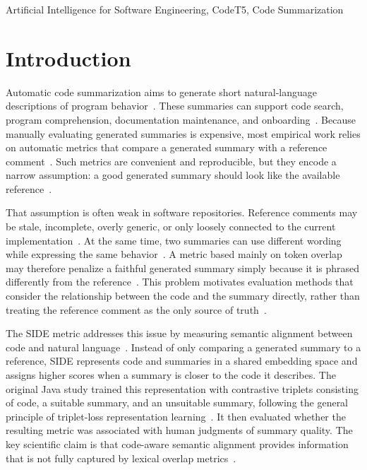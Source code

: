 \documentclass[conference]{IEEEtran}
\begin{document}
\begin{IEEEkeywords}
Artificial Intelligence for Software Engineering, CodeT5, Code Summarization
\end{IEEEkeywords}

\section{Introduction}

Automatic code summarization aims to generate short natural-language descriptions of program behavior~\cite{haiduc2010use,sridhara2010towards,mcburney2014automatic,allamanis2016convolutional,iyer2016summarizing,leclair2019neural}. These summaries can support code search, program comprehension, documentation maintenance, and onboarding~\cite{husain2019codesearchnet,lu2021codexglue}. Because manually evaluating generated summaries is expensive, most empirical work relies on automatic metrics that compare a generated summary with a reference comment~\cite{roy2021reassessing,shi2022evaluation,mastropaolo2024evaluating}. Such metrics are convenient and reproducible, but they encode a narrow assumption: a good generated summary should look like the available reference~\cite{papineni2002bleu,lin2004rouge,banerjee2005meteor,popovic2015chrf,zhang2019bertscore}.

That assumption is often weak in software repositories. Reference comments may be stale, incomplete, overly generic, or only loosely connected to the current implementation~\cite{roy2021reassessing,shi2022evaluation,mastropaolo2024evaluating}. At the same time, two summaries can use different wording while expressing the same behavior~\cite{zhang2019bertscore,ren2020codebleu,eghbali2022crystalbleu}. A metric based mainly on token overlap may therefore penalize a faithful generated summary simply because it is phrased differently from the reference~\cite{papineni2002bleu,lin2004rouge,banerjee2005meteor}. This problem motivates evaluation methods that consider the relationship between the code and the summary directly, rather than treating the reference comment as the only source of truth~\cite{mastropaolo2024evaluating}.

The SIDE metric addresses this issue by measuring semantic alignment between code and natural language~\cite{mastropaolo2024evaluating}. Instead of only comparing a generated summary to a reference, SIDE represents code and summaries in a shared embedding space and assigns higher scores when a summary is closer to the code it describes. The original Java study trained this representation with contrastive triplets consisting of code, a suitable summary, and an unsuitable summary, following the general principle of triplet-loss representation learning~\cite{schroff2015facenet,song2020mpnet}. It then evaluated whether the resulting metric was associated with human judgments of summary quality. The key scientific claim is that code-aware semantic alignment provides information that is not fully captured by lexical overlap metrics~\cite{roy2021reassessing,shi2022evaluation,mastropaolo2024evaluating}.
\end{document}
